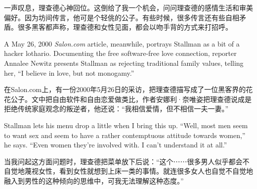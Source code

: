 \ifdefined\chs
一声叹息，理查德心神回位。这倒给了我一个机会，问问理查德的感情生活和审美偏好。因为坊间传言，他可是个轻佻的公子。有些时候，很多传言还有些自相矛盾。很多黑客都声称，理查德和女性见面，都会以吻手背的方式来打招呼。
\fi

\ifdefined\eng
A May 26, 2000 \textit{Salon.com} article, meanwhile, portrays Stallman as a bit of a hacker lothario. Documenting the free software-free love connection, reporter Annalee Newitz presents Stallman as rejecting traditional family values, telling her, ``I believe in love, but not monogamy.''
\fi

\ifdefined\chs
在Salon.com上，有一份2000年5月26日的采访，把理查德描写成了一位黑客界的花花公子。文中把自由软件和自由恋爱做类比，作者安娜利·奈唯姿把理查德说成是拒绝传统家庭观念的叛逆者，他还说：“我相信爱情，但不相信一夫一妻。”
\fi

\ifdefined\eng
Stallman lets his menu drop a little when I bring this up. ``Well, most men seem to want sex and seem to have a rather contemptuous attitude towards women,'' he says. ``Even women they're involved with. I can't understand it at all.''
\fi

\ifdefined\chs
当我问起这方面问题时，理查德把菜单放下后说：“这个⋯⋯很多男人似乎都会不自觉地蔑视女性，看到女性就想到上床一类的事情。就连很多女人也自觉不自觉地融入到男性的这种倾向的思维中，可我无法理解这种态度。”
\fi

